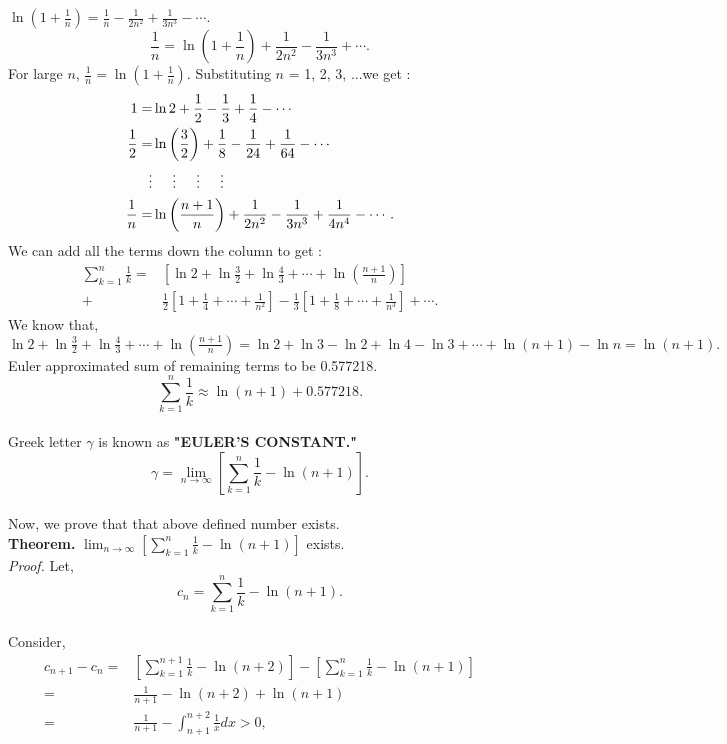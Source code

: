 \documentclass[a4paper,11pt]{article}
\begin{document}
$ \ln(1+\frac{1}{n}) = \frac{1}{n} - \frac{1}{2n^2} + \frac{1}{3n^3} - \cdots. $\\
$$ \frac{1}{n} = \ln(1+\frac{1}{n}) + \frac{1}{2n^2} - \frac{1}{3n^3} + \cdots. $$
For large $n$, $\frac{1}{n} = \ln\left(1+\frac{1}{n}\right)$. Substituting $n$ = 1, 2, 3, ...we get :
\begin{align*}
1 =& \ln2 + \frac{1}{2} - \frac{1}{3} + \frac{1}{4} - \cdots\\
\frac{1}{2} =& \ln\left(\frac{3}{2}\right) + \frac{1}{8} - \frac{1}{24} + \frac{1}{64} - \cdots\\
\vdots& \hspace{0.5cm} \vdots \hspace{0.5cm} \vdots \hspace{0.5cm} \vdots \\
\frac{1}{n} =& \ln\left(\frac{n+1}{n}\right) + \frac{1}{2n^2} - \frac{1}{3n^3} + \frac{1}{4n^4} - \cdots.\\
\end{align*}
We can add all the terms down the column to get :
\begin{align*}
\sum_{k=1}^{n} \frac{1}{k} =& [ \ln2 + \ln\frac{3}{2} + \ln\frac{4}{3} + \cdots + \ln(\frac{n+1}{n})]\\ +& \frac{1}{2}
[1 + \frac{1}{4} + \cdots + \frac{1}{n^2}] - \frac{1}{3} [1 + \frac{1}{8} + \cdots + \frac{1}{n^3}] + \cdots. 
\end{align*}
We know that,\\
$ \ln2 + \ln\frac{3}{2} + \ln\frac{4}{3} + \cdots + \ln(\frac{n+1}{n}) = \ln2 + \ln3 -\ln2 + \ln4 - \ln3 + \cdots + \ln(n+1) - \ln n = \ln(n+1) . $\\
Euler approximated sum of remaining terms to be 0.577218.
\\
$$ \sum_{k=1}^{n} \frac{1}{k} \approx \ln(n+1) + 0.577218. $$ \\
Greek letter $\gamma$ is known as \textbf{"EULER'S CONSTANT."}\\
$$ \gamma = \lim_{n\to\infty}[\sum_{k=1}^{n} \frac{1}{k} - \ln(n+1) ].$$\\
Now, we prove that that above defined number exists.\\
\noindent \textbf{Theorem.} $ \lim_{n\to\infty}[\sum_{k=1}^{n} \frac{1}{k} - \ln(n+1) ]$ exists.\\
\textit{Proof.}  Let,\\
$$  c_{n} = \sum_{k=1}^{n} \frac{1}{k} - \ln(n+1). $$\\
Consider,
\begin{align*}
c_{n+1} - c_{n}  =& [\sum_{k=1}^{n+1} \frac{1}{k} - \ln(n+2)] - [\sum_{k=1}^{n} \frac{1}{k} - \ln(n+1)] \\
 =&  \frac{1}{n+1} - \ln(n+2) + \ln(n+1) \\
=& \frac{1}{n+1} - \int_{n+1}^{n+2}\frac{1}{x}dx > 0,\\
\end{align*}
\end{document}
